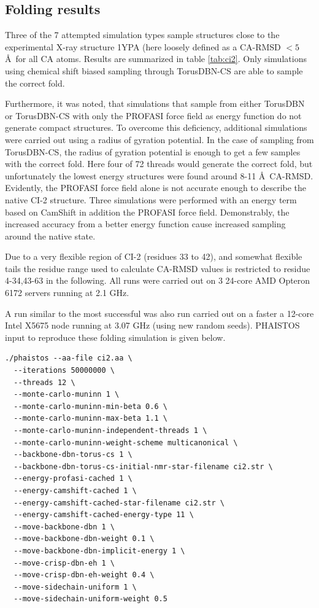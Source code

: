 \subsection{Folding results}
\label{sec:ci2_results}
Three of the 7 attempted simulation types sample structures close to the experimental X-ray structure 1YPA (here loosely defined as a CA-RMSD $<5$ \AA\ for all CA atoms. Results are summarized in table \ref{tab:ci2}.
Only simulations using chemical shift biased sampling through TorusDBN-CS are able to sample the correct fold.

Furthermore, it was noted, that simulations that sample from either TorusDBN or TorusDBN-CS with only the PROFASI force field as energy function do not generate compact structures.
To overcome this deficiency, additional simulations were carried out using a radius of gyration potential.
In the case of sampling from TorusDBN-CS, the radius of gyration potential is enough to get a few samples with the correct fold. Here four of 72 threads would generate the correct fold, but unfortunately the lowest energy structures were found around 8-11 \AA\ CA-RMSD. Evidently, the PROFASI force field alone is not accurate enough to describe the native CI-2 structure.
Three simulations were performed with an energy term based on CamShift in addition the PROFASI force field.
Demonstrably, the increased accuracy from a better energy function cause increased sampling around the native state.

Due to a very flexible region of CI-2 (residues 33 to 42), and somewhat flexible tails the residue range used to calculate CA-RMSD values is restricted to residue 4-34,43-63 in the following.
All runs were carried out on 3 24-core AMD Opteron 6172 servers running at 2.1 GHz. 

A run similar to the most successful was also run carried out on a faster a 12-core Intel X5675 node running at 3.07 GHz (using new random seeds).
PHAISTOS input to reproduce these folding simulation is given below.

\begin{lstlisting}
./phaistos --aa-file ci2.aa \
  --iterations 50000000 \
  --threads 12 \
  --monte-carlo-muninn 1 \
  --monte-carlo-muninn-min-beta 0.6 \
  --monte-carlo-muninn-max-beta 1.1 \
  --monte-carlo-muninn-independent-threads 1 \
  --monte-carlo-muninn-weight-scheme multicanonical \
  --backbone-dbn-torus-cs 1 \
  --backbone-dbn-torus-cs-initial-nmr-star-filename ci2.str \
  --energy-profasi-cached 1 \
  --energy-camshift-cached 1 \
  --energy-camshift-cached-star-filename ci2.str \
  --energy-camshift-cached-energy-type 11 \
  --move-backbone-dbn 1 \
  --move-backbone-dbn-weight 0.1 \
  --move-backbone-dbn-implicit-energy 1 \
  --move-crisp-dbn-eh 1 \
  --move-crisp-dbn-eh-weight 0.4 \
  --move-sidechain-uniform 1 \
  --move-sidechain-uniform-weight 0.5
\end{lstlisting}

